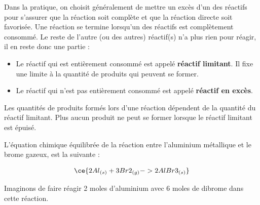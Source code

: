 \documentclass[
  11pt,
  a4paper,
  openany]{book}
\providecommand{\tightlist}{%
  \setlength{\itemsep}{0pt}\setlength{\parskip}{0pt}}
\begin{document}
Dans la pratique, on choisit généralement de mettre un excès d'un des réactifs pour s'assurer que la réaction soit complète et que la réaction directe soit favorisée. Une réaction se termine lorsqu'un des réactifs est complètement consommé. Le reste de l'autre (ou des autres) réactif(s) n'a plus rien pour réagir, il en reste donc une partie :

\begin{itemize}
\tightlist
\item
  Le réactif qui est entièrement consommé est appelé \textbf{réactif limitant}. Il fixe une limite à la quantité de produits qui peuvent se former.
\item
  Le réactif qui n'est pas entièrement consommé est appelé \textbf{réactif en excès}.
\end{itemize}

Les quantités de produits formés lors d'une réaction dépendent de la quantité du réactif limitant. Plus aucun produit ne peut se former lorsque le réactif limitant est épuisé.

L'équation chimique équilibrée de la réaction entre l'aluminium métallique et le brome gazeux, est la suivante :

\[ \ce{ 2 Al{}_{(s)} + 3 Br2{}_{(g)} -> 2 AlBr3{}_{(s)} } \]

Imaginons de faire réagir 2 moles d'aluminium avec 6 moles de dibrome dans cette réaction.
\end{document}

